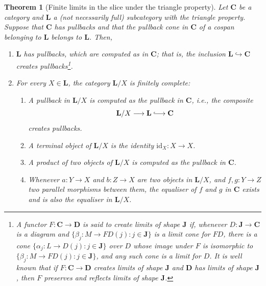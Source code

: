 \documentclass[12pt]{amsart}
\theoremstyle{plain}
\newtheorem{theorem}{Theorem}[section]
\theoremstyle{definition}
\newcommand{\cat}[1]{\mathbf{#1}}
\newcommand{\id}{\mathrm{id}}
\renewcommand{\L}{\cat{L}}
\newcommand{\longhookrightarrow}{\lhook\joinrel\longrightarrow}
\begin{document}
\begin{theorem}[Finite limits in the slice under the triangle property] \label{t:the-triangle-property-is-not-that-bad-GENERAL}
    Let $\cat{C}$ be a category and $\cat{L}$ a (not necessarily full) subcategory with the triangle property.
    Suppose that $\cat{C}$ has pullbacks and that the pullback cone in $\cat{C}$ of a cospan belonging to $\cat{L}$ belongs to $\cat{L}$.
    Then, 
    \begin{enumerate}
        \item \label{t:the-triangle-property-is-not-that-bad1}
        $\cat{L}$ has pullbacks, which are computed as in $\cat{C}$; that is, the inclusion $\cat{L}\hookrightarrow \cat{C}$ creates pullbacks\footnote{A functor $F\colon \cat{C}\to\cat{D}$ is said to \emph{create limits of shape $\cat{J}$} if, whenever $D\colon \cat{J}\to \cat{C}$ is a diagram and $\{\beta_j\colon M\to FD(j) : j\in \cat{J}\}$ is a limit cone for $FD$, there is a cone $\{\alpha_j\colon L\to D(j) : j\in \cat{J}\}$ over $D$ whose image under $F$ is isomorphic to $\{\beta_j\colon M\to FD(j) : j\in \cat{J}\}$, and any such cone is a limit for $D$.  It is well known that if $F\colon \cat{C}\to\cat{D}$ creates limits of shape $\cat{J}$ and $\cat{D}$ has limits of shape $\cat{J}$, then $F$ preserves and reflects limits of shape $\cat{J}$.}.
        \item \label{t:the-triangle-property-is-not-that-bad2}
        For every $X\in \L$, the category $\cat{L}/X$ is finitely complete:
        \begin{enumerate}
        
            \item \label{i:pullback-as-in-C}
            A pullback in $\cat{L}/X$ is computed as the pullback in $\cat{C}$, i.e., the composite
            \[
                \cat{L}/X \longrightarrow \cat{L}\longhookrightarrow \cat{C}
            \]
            creates pullbacks.
        
            \item 
            A terminal object of $\cat{L}/X$ is the identity $\id_X \colon X \to X$.

            \item 
            A product of two objects of $\cat{L}/X$ is computed as the pullback in $\cat{C}$.

            \item
            Whenever $a \colon Y\to X$ and $b \colon Z\to X$ are two objects in $\cat{L}/X$, and $f,g\colon Y\to Z$ two parallel morphisms between them, the equaliser of $f$ and $g$ in $\cat{C}$ exists and is also the equaliser in $\cat{L}/X$.
        \end{enumerate}
    \end{enumerate}
\end{theorem}
\end{document}

